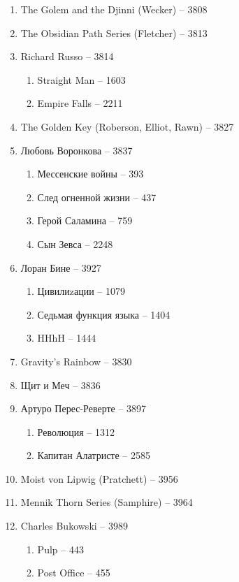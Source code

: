 \documentclass[a4paper, 11pt]{proc} %
\begin{document}
\begin{enumerate}
\begin{enumerate}
        \end{enumerate}
    \item The Golem and the Djinni (Wecker) -- 3808
    \item The Obsidian Path Series (Fletcher) -- 3813
    \item Richard Russo -- 3814
        \begin{enumerate}
            \item Straight Man -- 1603
            \item Empire Falls -- 2211
        \end{enumerate}
    \item The Golden Key (Roberson, Elliot, Rawn) -- 3827
    \item Любовь Воронкова -- 3837
        \begin{enumerate}
            \item Мессенские войны -- 393
            \item След огненной жизни -- 437
            \item Герой Саламина -- 759
            \item Сын Зевса -- 2248
        \end{enumerate}
    \item Лоран Бине -- 3927
        \begin{enumerate}
            \item Цивилиzации -- 1079
            \item Седьмая функция языка -- 1404
            \item HHhH -- 1444
        \end{enumerate}
    \item Gravity's Rainbow -- 3830
    \item Щит и Меч -- 3836
    \item Артуро Перес-Реверте -- 3897
        \begin{enumerate}
            \item Революция -- 1312
            \item Капитан Алатристе -- 2585
        \end{enumerate}
    \item Moist von Lipwig (Pratchett) -- 3956
    \item Mennik Thorn Series (Samphire) -- 3964
    \item Charles Bukowski -- 3989
        \begin{enumerate}
            \item Pulp -- 443
            \item Post Office -- 455

\end{enumerate}
\end{enumerate}
\end{document}
